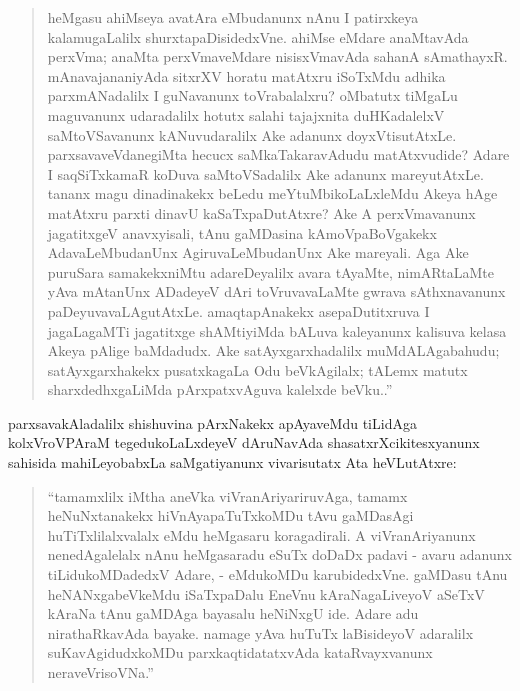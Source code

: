 \begin{quote}
heMgasu ahiMseya avatAra eMbudanunx nAnu I patirxkeya kalamu\-gaLalilx shurxta\-paDisidedxVne. ahiMse eMdare anaMtavAda perxVma; anaMta perxVmaveMdare nisisxVmavAda sahanA sAmathayxR. mAnavajananiyAda sitxrXV horatu matAtxru iSoTxMdu adhika parxmANadalilx I guNa\-vanunx toVrabalalxru? oMbatutx tiMgaLu maguvanunx udaradalilx hotutx salahi tajajxnita duHKadalelxV saMtoVSavanunx kANuvudaralilx Ake adanunx doyxVti\-sutAtxLe. parxsavaveVdanegiMta hecucx saMkaTakaravAdudu matAtxvudide? Adare I saqSiTxkamaR koDuva saMtoVSadalilx Ake adanunx mareyu\-tAtxLe. tananx magu dinadinakekx beLedu meYtuMbikoLaLxleMdu Akeya hAge matAtxru parxti dinavU kaSaTxpaDutAtxre? Ake A perxVmavanunx jagatitxgeV anavxyisali, tAnu gaMDasina kAmoVpaBoVgakekx AdavaLeMbudanUnx AgiruvaLeMbudanUnx Ake mareyali. Aga Ake puruSara samakekx\-niMtu adareDeyalilx avara tAyaMte, nimARtaLaMte yAva mAtanUnx ADadeyeV dAri toVruvavaLaMte gwrava sAthxnavanunx paDeyuvavaLAgutAtxLe. amaqtapAnakekx asepaDutitxruva I jagaLagaMTi jagatitxge shAMtiyiMda bALuva kaleyanunx kalisuva kelasa Akeya pAlige baMdadudx. Ake satAyxgarxhadalilx  muMdALAgabahudu; satAyxgarxhakekx pusatxkagaLa Odu beVkAgilalx; tALemx matutx sharxdedhxgaLiMda pArxpatxvAguva kalelxde beVku..''
\end{quote}

parxsavakAladalilx shishuvina pArxNakekx apAyaveMdu tiLidAga kolxVroVPAraM tegedu\-koLaLxdeyeV dAruNavAda shasatxrXcikitesxyanunx sahisida mahiLeyobabxLa saMgatiyanunx vivarisutatx Ata heVLutAtxre:
\begin{quote}
``tamamxlilx iMtha aneVka viVranAriyariruvAga, tamamx heNuNxtanakekx hiVnAyapaTuTxkoMDu tAvu gaMDasAgi huTiTxlilalxvalalx eMdu heMga\-saru koragadirali. A viVranAriyanunx nenedAgalelalx nAnu heMgasaradu eSuTx doDaDx padavi - avaru adanunx tiLidukoMDadedxV Adare, - eMdu\-koMDu karubidedxVne. gaMDasu tAnu heNANxgabeVkeMdu iSaTx\-paDalu EneVnu kAraNagaLiveyoV aSeTxV kAraNa tAnu gaMDAga baya\-salu heNiNxgU ide. Adare adu nirathaRkavAda bayake. namage yAva huTuTx laBisideyoV adaralilx suKavAgidudxkoMDu parxkaqtidatatxvAda kataRvayxvanunx neraveVrisoVNa.''
\end{quote}

